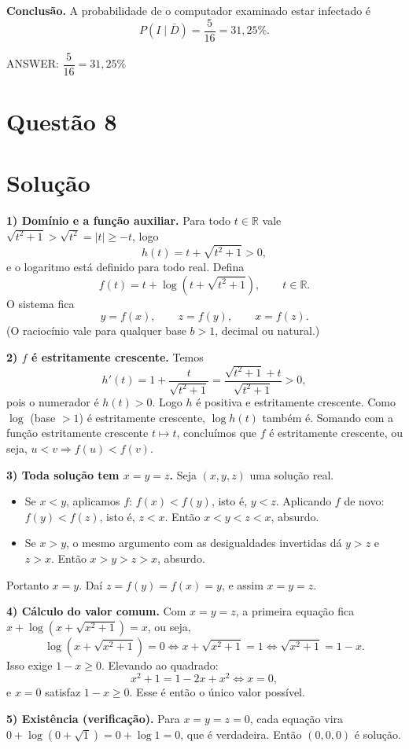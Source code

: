 \documentclass{article}%
\begin{document}
\textbf{Conclusão.} A probabilidade de o computador examinado estar infectado é
\[
P(I\mid \bar D)=\frac{5}{16}=31{,}25\%.
\]

ANSWER: $\dfrac{5}{16}=31{,}25\%$%
\newpage%
\section*{Questão 8}

\section*{Solução}

\textbf{1) Domínio e a função auxiliar.} Para todo $t\in\mathbb{R}$ vale $\sqrt{t^2+1}>\sqrt{t^2}=|t|\geq -t$, logo
\[
h(t)=t+\sqrt{t^2+1}>0 ,
\]
e o logaritmo está definido para todo real. Defina
\[
f(t)=t+\log\left(t+\sqrt{t^2+1}\right),\qquad t\in\mathbb{R}.
\]
O sistema fica
\[
y=f(x),\qquad z=f(y),\qquad x=f(z).
\]
(O raciocínio vale para qualquer base $b>1$, decimal ou natural.)

\textbf{2) $f$ é estritamente crescente.} Temos
\[
h'(t)=1+\frac{t}{\sqrt{t^2+1}}=\frac{\sqrt{t^2+1}+t}{\sqrt{t^2+1}}>0,
\]
pois o numerador é $h(t)>0$. Logo $h$ é positiva e estritamente crescente. Como $\log$ (base $>1$) é estritamente crescente, $\log h(t)$ também é. Somando com a função estritamente crescente $t\mapsto t$, concluímos que $f$ é estritamente crescente, ou seja, $u<v \Rightarrow f(u)<f(v)$.

\textbf{3) Toda solução tem $x=y=z$.} Seja $(x,y,z)$ uma solução real.
\begin{itemize}
\item Se $x<y$, aplicamos $f$: $f(x)<f(y)$, isto é, $y<z$. Aplicando $f$ de novo: $f(y)<f(z)$, isto é, $z<x$. Então $x<y<z<x$, absurdo.
\item Se $x>y$, o mesmo argumento com as desigualdades invertidas dá $y>z$ e $z>x$. Então $x>y>z>x$, absurdo.
\end{itemize}
Portanto $x=y$. Daí $z=f(y)=f(x)=y$, e assim $x=y=z$.

\textbf{4) Cálculo do valor comum.} Com $x=y=z$, a primeira equação fica $x+\log\left(x+\sqrt{x^2+1}\right)=x$, ou seja,
\[
\log\left(x+\sqrt{x^2+1}\right)=0 \iff x+\sqrt{x^2+1}=1 \iff \sqrt{x^2+1}=1-x .
\]
Isso exige $1-x\geq 0$. Elevando ao quadrado:
\[
x^2+1=1-2x+x^2 \iff x=0 ,
\]
e $x=0$ satisfaz $1-x\geq 0$. Esse é então o único valor possível.

\textbf{5) Existência (verificação).} Para $x=y=z=0$, cada equação vira $0+\log\left(0+\sqrt{1}\right)=0+\log 1=0$, que é verdadeira. Então $(0,0,0)$ é solução.
\end{document}
